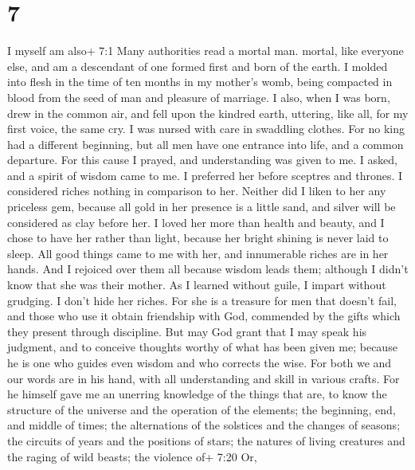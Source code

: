 \hypertarget{section-5}{%
\section{7}\label{section-5}}

 I myself am also+ 7:1 Many authorities read a mortal man.
mortal, like everyone else, and am a descendant of one formed first and
born of the earth.  I molded into flesh in the time of ten
months in my mother's womb, being compacted in blood from the seed of
man and pleasure of marriage.  I also, when I was born, drew
in the common air, and fell upon the kindred earth, uttering, like all,
for my first voice, the same cry.  I was nursed with care in
swaddling clothes.  For no king had a different beginning,
 but all men have one entrance into life, and a common
departure.  For this cause I prayed, and understanding was
given to me. I asked, and a spirit of wisdom came to me.  I
preferred her before sceptres and thrones. I considered riches nothing
in comparison to her.  Neither did I liken to her any
priceless gem, because all gold in her presence is a little sand, and
silver will be considered as clay before her.  I loved her
more than health and beauty, and I chose to have her rather than light,
because her bright shining is never laid to sleep.  All
good things came to me with her, and innumerable riches are in her
hands.  And I rejoiced over them all because wisdom leads
them; although I didn't know that she was their mother.  As
I learned without guile, I impart without grudging. I don't hide her
riches.  For she is a treasure for men that doesn't fail,
and those who use it obtain friendship with God, commended by the gifts
which they present through discipline.  But may God grant
that I may speak his judgment, and to conceive thoughts worthy of what
has been given me; because he is one who guides even wisdom and who
corrects the wise.  For both we and our words are in his
hand, with all understanding and skill in various crafts. 
For he himself gave me an unerring knowledge of the things that are, to
know the structure of the universe and the operation of the elements;
 the beginning, end, and middle of times; the alternations
of the solstices and the changes of seasons;  the circuits
of years and the positions of stars;  the natures of living
creatures and the raging of wild beasts; the violence of+ 7:20 Or,
